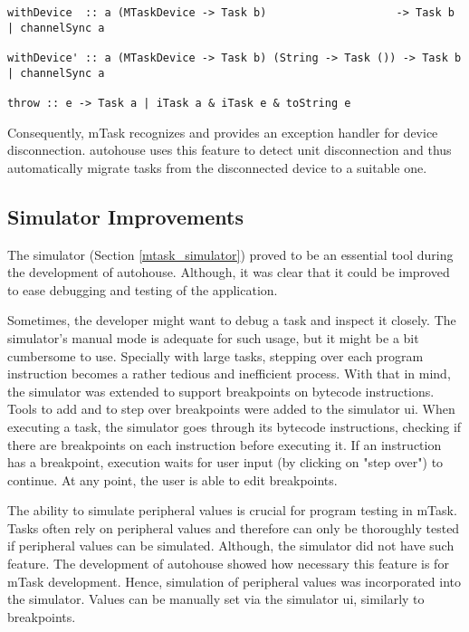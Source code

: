 \begin{lstlisting}[caption=Change in mTask to support a device disconnection handler,captionpos=b,label=with_device]
withDevice  :: a (MTaskDevice -> Task b)                    -> Task b | channelSync a

withDevice' :: a (MTaskDevice -> Task b) (String -> Task ()) -> Task b | channelSync a

throw :: e -> Task a | iTask a & iTask e & toString e
\end{lstlisting}

Consequently, \gls{mTask} recognizes and provides an exception handler for device disconnection. \gls{autohouse} uses this feature to detect unit disconnection and thus automatically migrate tasks from the disconnected device to a suitable one.

\subsection{Simulator Improvements}\label{sec:sim_improv}

The simulator (Section \ref{mtask_simulator}) proved to be an essential tool during the development of \gls{autohouse}. Although, it was clear that it could be improved to ease debugging and testing of the application. 

Sometimes, the developer might want to debug a task and inspect it closely. The simulator's manual mode is adequate for such usage, but it might be a bit cumbersome to use. Specially with large tasks, stepping over each program instruction becomes a rather tedious and inefficient process. With that in mind, the simulator was extended to support breakpoints on bytecode instructions. Tools to add and to step over breakpoints were added to the simulator \acs{ui}. When executing a task, the simulator goes through its bytecode instructions, checking if there are breakpoints on each instruction before executing it. If an instruction has a breakpoint, execution waits for user input (by clicking on "step over") to continue. At any point, the user is able to edit breakpoints. 

The ability to simulate peripheral values is crucial for program testing in \gls{mTask}. Tasks often rely on peripheral values and therefore can only be thoroughly tested if peripheral values can be simulated. Although, the simulator did not have such feature. The development of \gls{autohouse} showed how necessary this feature is for \gls{mTask} development. Hence, simulation of peripheral values was incorporated into the simulator. Values can be manually set via the simulator \acs{ui}, similarly to breakpoints. 

